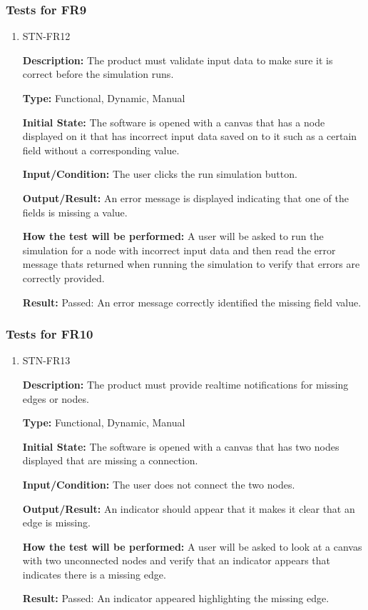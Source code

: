 \documentclass[12pt, titlepage]{article}
\begin{document}
\subsubsection{Tests for FR9}
\begin{enumerate}
\item{STN-FR12\\}

\textbf{Description:} The product must validate input data to make sure it is correct before the simulation runs.

\textbf{Type:} Functional, Dynamic, Manual

\textbf{Initial State:} The software is opened with a canvas that has a node displayed on it that has incorrect input data saved on to it such as a certain field without a corresponding value.

\textbf{Input/Condition:} The user clicks the run simulation button.

\textbf{Output/Result:} An error message is displayed indicating that one of the fields is missing a value.

\textbf{How the test will be performed:} A user will be asked to run the simulation for a node with incorrect input data and then read the error message thats returned when running the simulation to verify that errors are correctly provided.

\textbf{Result:} Passed: An error message correctly identified the missing field value.

\end{enumerate}

\subsubsection{Tests for FR10}
\begin{enumerate}
\item{STN-FR13\\}


\textbf{Description:} The product must provide realtime notifications for missing edges or nodes.

\textbf{Type:} Functional, Dynamic, Manual

\textbf{Initial State:} The software is opened with a canvas that has two nodes displayed that are missing a connection.

\textbf{Input/Condition:} The user does not connect the two nodes.

\textbf{Output/Result:} An indicator should appear that it makes it clear that an edge is missing.

\textbf{How the test will be performed:} A user will be asked to look at a canvas with two unconnected nodes and verify that an indicator appears that indicates there is a missing edge.

\textbf{Result:} Passed: An indicator appeared highlighting the missing edge.

\end{enumerate}
\end{document}
